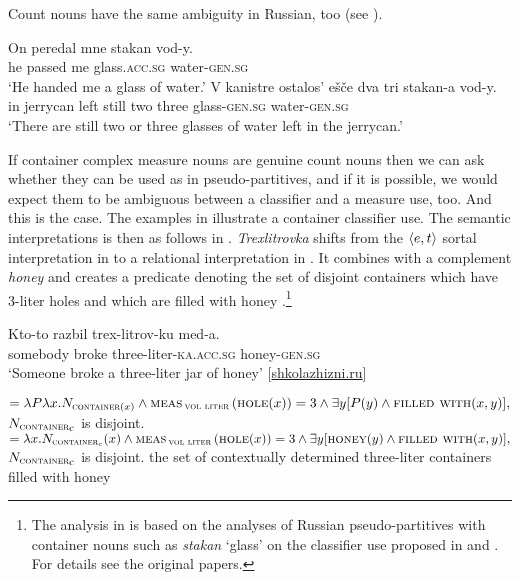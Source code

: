 \documentclass[output=paper,
colorlinks,
citecolor=brown,
newtxmath
]{langscibook}
\begin{document}
\noindent Count nouns have the same ambiguity in Russian, too  (see \citealt{Partee.Borschev2012,Khrizman.Rothstein2015,Khrizman2016a,Khrizman2016b}).

\ea\label{ex:28}
    \ea \gll On peredal mne stakan vod-y.\\
    he passed me glass.\textsc{acc.sg} water-\textsc{gen.sg}\\
    \glt `He handed me a glass of water.'
    \ex \gll V kanistre ostalos' ešče dva tri stakan-a vod-y.\\
    in jerrycan left still two three glass-\textsc{gen.sg} water-\textsc{gen.sg}\\
    \glt `There are still two or three glasses of water left in the jerrycan.'
\z\z

\noindent If container complex measure nouns are genuine count nouns then we can ask whether they can be used as in pseudo-partitives, and if it is possible, we would expect them to be ambiguous between a classifier and a measure use, too. And this is the case. The examples in  illustrate a container classifier use. The semantic interpretations is then as follows in . \textit{Trexlitrovka} shifts from the $\langle{e,t}\rangle$ sortal interpretation in  to a relational interpretation in . It combines with a complement \textit{honey} and creates a predicate denoting the set of disjoint containers which have 3-liter holes and which are filled with honey .\footnote{The analysis in  is based on the analyses of Russian pseudo-partitives with container nouns such as \textit{stakan} `glass' on the classifier use proposed in \citet{Partee.Borschev2012} and \citet{Khrizman2016a,Khrizman2016b}. For details see the original papers.}

\ea\label{ex:29}
    \ea\label{ex:29a} \gll Kto-to razbil trex-litrov-ku med-a.\\
    somebody broke three-liter-\textsc{ka.acc.sg} honey-\textsc{gen.sg}\\
    \glt `Someone broke a three-liter jar of honey' \hfill [\href{http://shkolazhizni.ru/psychology/articles/57018/}{shkolazhizni.ru}]
\z\z

\ea\label{ex:30}
    \ea\label{ex:30a}  $= \lambda P \lambda x.N_{\textsc{container}(x)} \wedge \textsc{meas}\,_{\textsc{vol liter}}\,(\textsc{hole}(x)) = 3 \wedge \exists y [P(y) \wedge \textsc{filled with}(x,y)],$
    {\small $N_{\textsc{container}\textsubscript{c}}$ is disjoint.}
    \ex\label{ex:30b}  $= \lambda x.N_{\textsc{container}_{c}}(x) \wedge \textsc{meas}\,_{\textsc{vol liter}}\,(\textsc{hole}(x)) = 3 \wedge \exists y [\textsc{honey}(y) \wedge \textsc{filled with}(x,y)],$
    {\small $N_{\textsc{container}\textsubscript{c}}$ is disjoint.}
    \z
{\small the set of contextually determined three-liter containers filled with honey}
\z
\end{document}
